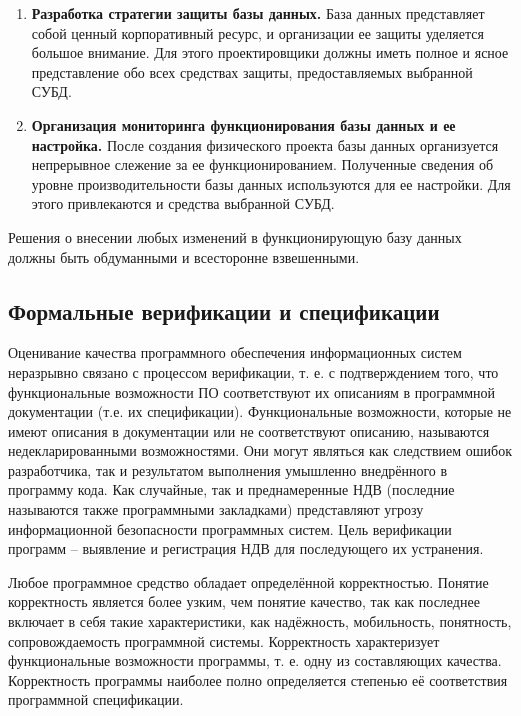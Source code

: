 \begin{enumerate}
    \item \textbf{Разработка стратегии защиты базы данных.}
        База данных представляет собой ценный корпоративный ресурс, и организации ее защиты уделяется большое
        внимание. Для этого проектировщики должны иметь полное и ясное представление обо всех средствах защиты,
        предоставляемых выбранной СУБД.

    \item \textbf{Организация мониторинга функционирования базы данных и ее настройка.}
        После создания физического проекта базы данных организуется непрерывное слежение за ее функционированием.
        Полученные сведения об уровне производительности базы данных используются для ее настройки. Для этого
        привлекаются и средства выбранной СУБД.
\end{enumerate}

Решения о внесении любых изменений в функционирующую базу данных должны быть обдуманными и всесторонне взвешенными.

\subsection{Формальные верификации и спецификации}
Оценивание качества программного обеспечения информационных систем неразрывно связано с процессом верификации,
т. е. с подтверждением того, что функциональные возможности ПО соответствуют их описаниям в программной документации
(т.е. их спецификации). Функциональные возможности, которые не имеют описания в документации или не соответствуют
описанию, называются недекларированными возможностями. Они могут являться как следствием ошибок разработчика,
так и результатом выполнения умышленно внедрённого в программу кода. Как случайные, так и преднамеренные НДВ
(последние называются также программными закладками) представляют угрозу информационной безопасности программных
систем. Цель верификации программ – выявление и регистрация НДВ для последующего их устранения.

Любое программное средство обладает определённой корректностью. Понятие корректность является более узким,
чем понятие качество, так как последнее включает в себя такие характеристики, как надёжность, мобильность,
понятность, сопровождаемость программной системы. Корректность характеризует функциональные возможности программы,
т. е. одну из составляющих качества. Корректность программы наиболее полно определяется степенью её соответствия
программной спецификации.


